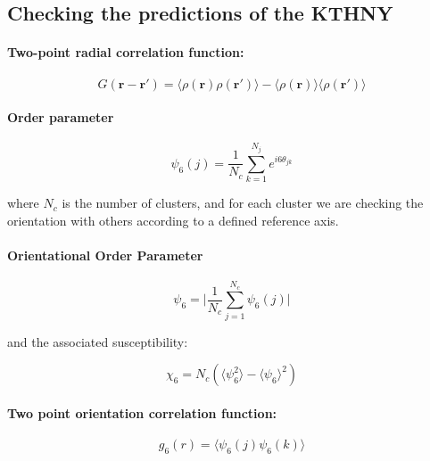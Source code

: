 \documentclass[a4paper]{article}
\begin{document}
\subsection{Checking the predictions of the KTHNY}

\paragraph{Two-point radial correlation function:}

\begin{equation}
	G(\mathbf{r}-\mathbf{r'}) = \langle\rho(\mathbf{r})\rho(\mathbf{r}')\rangle-\langle\rho(\mathbf{r})\rangle\langle\rho(\mathbf{r}')\rangle
\end{equation}

\paragraph{Order parameter}

\begin{equation}
	\psi_6(j)=\frac{1}{N_c}\sum_{k=1}^{N_j}e^{i6\theta_{jk}}
\end{equation}

where $N_c$ is the number of clusters, and for each cluster we are checking the orientation with others according to a defined reference axis.

\paragraph{Orientational Order Parameter}

\begin{equation}
	\psi_6 = \lvert \frac{1}{N_c}\sum_{j=1}^{N_c}\psi_6(j) \lvert
\end{equation}

and the associated susceptibility:

\begin{equation}
	\chi_6 = N_c \left(\langle \psi_6^2\rangle -\langle\psi_6\rangle^2\right)
\end{equation}

\paragraph{Two point orientation correlation function:}

\begin{equation}
	g_6(r)=\langle\psi_6(j)\psi_6(k)\rangle
\end{equation}
\end{document}
